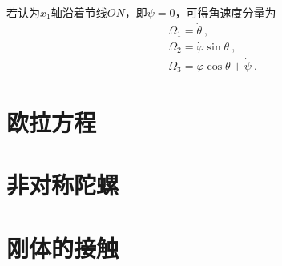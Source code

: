 \documentclass[11pt,a4paper]{article}
\begin{document}
若认为$x_1$轴沿着节线$ON$，即$\psi = 0$，可得角速度分量为
\begin{align}
& \Omega_1 = \dot{\theta} ~, \\
& \Omega_2 = \dot{\varphi} \sin \theta ~, \\
& \Omega_3 = \dot{\varphi} \cos \theta +\dot{\psi} ~.
\end{align}



















\section{欧拉方程}












































\section{非对称陀螺}













\section{刚体的接触}





















\end{document}
